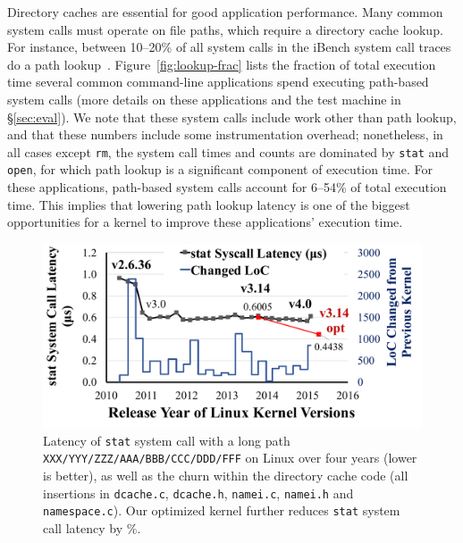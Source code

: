 Directory caches are essential for good application performance.
Many common system calls must operate on file paths,
which require a directory cache lookup.
For instance, between 10--20\% of all system calls in the iBench system call traces do a path lookup~\cite{filenotafile}. 
Figure~\ref{fig:lookup-frac} lists the fraction of total execution time
several common command-line applications spend executing path-based system calls
(more details on these applications and the test machine in \S\ref{sec:eval}).
We note that these system calls include work other than path lookup,
and that these numbers include some instrumentation overhead;
nonetheless, in all cases except {\tt rm},
the system call times and counts are dominated by
{\tt stat} and {\tt open}, for which 
path lookup is a significant component of execution time.
For these applications, path-based system calls account for 6--54\% of total execution time.
This implies that
lowering path lookup latency is
 one of the  biggest 
opportunities for a kernel to improve these applications' execution time.




\begin{figure}[t!]
\includegraphics[width=1.0\linewidth]{dcache/plots/latency-by-version.pdf}
\vspace{-17pt}
\footnotesize
\caption{Latency of {\tt stat} system call with a long path {\tt XXX/YYY/ZZZ/AAA/BBB/CCC/DDD/FFF} on Linux over four years (lower is better), as well as the churn within the directory cache code (all insertions in {\tt dcache.c}, {\tt dcache.h}, {\tt namei.c}, {\tt namei.h} and {\tt namespace.c}). 
Our optimized \linuxver{} kernel 
further reduces {\tt stat} system call latency by \statspeedup{}\%.
}
\label{fig:by-version}
\end{figure}


